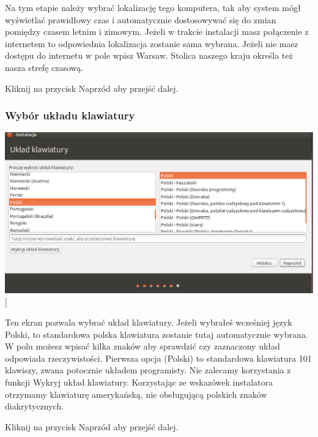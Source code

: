 Na tym etapie należy wybrać lokalizację tego komputera, tak aby system mógł wyświetlać prawidłowy czas i automatycznie dostosowywać się do zmian pomiędzy czasem letnim i zimowym. Jeżeli w trakcie instalacji masz połączenie z internetem to odpowiednia lokalizacja zostanie sama wybrana. Jeżeli nie masz dostępu do internetu w pole wpisz \textcolor{ubuntu_orange}{Warsaw}. Stolica naszego kraju określa też nasza strefę czasową.
\begin{flushright}
Kliknij na przycisk \textcolor{ubuntu_orange}{Naprzód} aby przejść dalej.
\end{flushright}
\clearpage
\subsubsection{Wybór układu klawiatury}
\begin{center}
        \includegraphics[width=\linewidth]{images/instalator_klawiatura.png}]
\end{center}

Ten ekran pozwala wybrać układ klawiatury. Jeżeli wybrałeś wcześniej język Polski, to standardowa polska klawiatura zostanie tutaj automatycznie wybrana. W polu możesz wpisać kilka znaków aby sprawdzić czy zaznaczony układ odpowiada rzeczywistości. Pierwsza opcja (\textcolor{ubuntu_orange}{Polski}) to standardowa klawiatura 101 klawiszy, zwana potocznie układem programisty.
Nie zalecamy korzystania z funkcji \textcolor{ubuntu_orange}{Wykryj układ klawiatury}. Korzystając ze wskazówek instalatora otrzymamy klawiaturę amerykańską, nie obsługującą polskich znaków diakrytycznych.
\begin{flushright}
Kliknij na przycisk \textcolor{ubuntu_orange}{Naprzód} aby przejść dalej.
\end{flushright}
\clearpage
